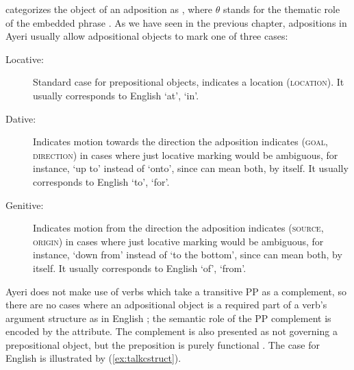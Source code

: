 \Lfg{} categorizes the object of an adposition as \Oblique{}, where $\theta$
stands for the thematic role of the embedded phrase \citep[9--10]
{dalrymple2001}. As we have seen in the previous chapter, adpositions in Ayeri
usually allow adpositional objects to mark one of three cases:

\begin{description}
	\item[Locative:] Standard case for prepositional objects, indicates a
	location (\textsc{location}). It usually corresponds to English `at', `in'.

	\item[Dative:] Indicates motion towards the direction the adposition
	indicates (\textsc{goal}, \textsc{direction}) in cases where just locative
	marking would be ambiguous, for instance, `up to' instead of `onto', since
	 can mean both, by itself. It usually corresponds
	to English `to', `for'.

	\item[Genitive:] Indicates motion from the direction the adposition
	indicates (\textsc{source}, \textsc{origin}) in cases where just locative
	marking would be ambiguous, for instance, `down from' instead of `to the
	bottom', since   can mean both, by itself. It
	usually corresponds to English `of', `from'.
\end{description}

Ayeri does not make use of verbs which take a transitive PP as a complement, so
there are no cases where an adpositional object is a required part of a verb's
argument structure as in English ; the semantic role of the
PP complement is encoded by the \PCase{} attribute. The complement is also
presented as not governing a prepositional object, but the preposition is
purely functional \citep[151--153]{dalrymple2001}. The case for English is
illustrated by (\ref{ex:talkcstruct}).

